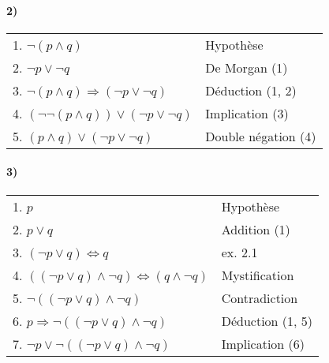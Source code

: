     \paragraph{2)}
    \begin{center}
    \begin{tabular}{|l|l|}
    \hline
    \hspace{0.5cm} 1. $\neg (p \land q)$ & Hypothèse \\
    \hspace{0.5cm} 2. $\neg p \lor \neg q$ & De Morgan (1) \\
    3. $\neg (p \land q) \Rightarrow (\neg p \lor \neg q)$ & Déduction (1, 2) \\
    4. $(\neg \neg(p \land q)) \lor (\neg p \lor \neg q)$ & Implication (3) \\ 
    5. $(p \land q) \lor (\neg p \lor \neg q)$ & Double négation (4) \\
    \hline
    \end{tabular}
    \end{center}

    \paragraph{3)}
    \begin{center}
    \begin{tabular}{|l|l|}
    \hline
    \hspace{0.5cm} 1. $p$ & Hypothèse \\
    \hspace{0.5cm} 2. $p \lor q$ & Addition (1) \\
    \hspace{0.5cm} 3. $(\neg p \lor q) \Leftrightarrow q$ & ex. 2.1 \\
    \hspace{0.5cm} 4. $((\neg p \lor q) \land \neg q) \Leftrightarrow (q \land \neg q)$ & Mystification \\ 
    \hspace{0.5cm} 5. $\neg ((\neg p \lor q) \land \neg q)$ & Contradiction \\
    6. $p \Rightarrow \neg ((\neg p \lor q) \land \neg q)$ & Déduction (1, 5) \\
    7. $\neg p \lor \neg ((\neg p \lor q) \land \neg q)$ & Implication (6) \\
    \hline
    \end{tabular}
    \end{center}



